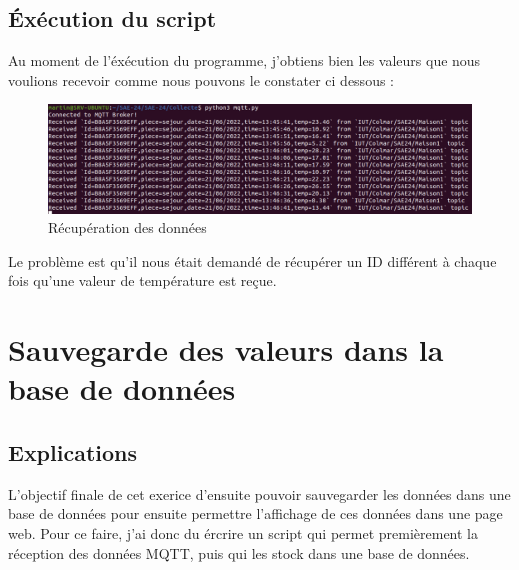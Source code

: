 \documentclass[12pt, a4paper]{article}
\begin{document}
		\subsection{Éxécution du script}
		Au moment de l'éxécution du programme, j'obtiens bien les valeurs que 
		nous voulions recevoir comme nous pouvons le constater ci dessous :
		\begin{figure}[H]
			\centering
			\includegraphics[width=1\textwidth]{../img/recup.png}
			\caption{Récupération des données}
			\label{fig:recup}
		\end{figure}
		Le problème est qu'il nous était demandé de récupérer un ID différent
		à chaque fois qu'une valeur de température est reçue.

	\section{Sauvegarde des valeurs dans la base de données}
		\subsection{Explications}
		L'objectif finale de cet exerice d'ensuite pouvoir sauvegarder les données dans une 
		base de données pour ensuite permettre l'affichage de ces données dans une page web.
		Pour ce faire, j'ai donc du ércrire un script qui permet premièrement la réception
		des données MQTT, puis qui les stock dans une base de données.
\end{document}
